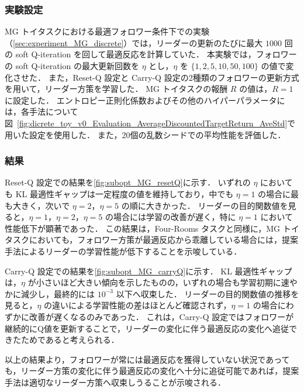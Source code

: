 \documentclass[originalpaper,fleqn]{jsaiart}     %
\begin{document}
\subsubsection{実験設定}

MG トイタスクにおける最適フォロワー条件下での実験（\ref{sec:experiment_MG_discrete}）では，リーダーの更新のたびに最大 $1000$ 回の soft Q-iteration を回して最適反応を計算していた．
本実験では，フォロワーの soft Q-iteration の最大更新回数を $\eta$ とし，$\eta$ を $\{1,2,5,10,50,100\}$ の値で変化させた．
また，Reset-Q 設定と Carry-Q 設定の2種類のフォロワーの更新方式を用いて，リーダー方策を学習した．
MG トイタスクの報酬 $R$ の値は，$R=1$ に設定した．
エントロピー正則化係数およびその他のハイパーパラメータには，各手法について図~\ref{fig:dicrete_toy_v0_Evaluation_AverageDiscountedTargetReturn_AveStd}で用いた設定を使用した．
また，20個の乱数シードでの平均性能を評価した．

\subsubsection{結果}

Reset-Q 設定での結果を\ref{fig:subopt_MG_resetQ}に示す．
いずれの $\eta$ においても KL 最適性ギャップは一定程度の値を維持しており，中でも $\eta=1$ の場合に最も大きく，次いで $\eta=2$，$\eta=5$ の順に大きかった．
リーダーの目的関数値を見ると，$\eta=1$，$\eta=2$，$\eta=5$ の場合には学習の改善が遅く，特に $\eta=1$ において性能低下が顕著であった．
この結果は，Four-Rooms タスクと同様に，MG トイタスクにおいても，フォロワー方策が最適反応から乖離している場合には，提案手法によるリーダーの学習性能が低下することを示唆している．

Carry-Q 設定での結果を\ref{fig:subopt_MG_carryQ}に示す．
KL 最適性ギャップは，$\eta$ が小さいほど大きい傾向を示したものの，いずれの場合も学習初期に速やかに減少し，最終的には $10^{-3}$ 以下へ収束した．
リーダーの目的関数値の推移を見ると，$\eta$ の違いによる学習性能の差はほとんど確認されず，$\eta=1$ の場合にわずかに改善が遅くなるのみであった．
これは，Carry-Q 設定ではフォロワーが継続的にQ値を更新することで，リーダーの変化に伴う最適反応の変化へ追従できたためであると考えられる．

以上の結果より，フォロワーが常には最適反応を獲得していない状況であっても，リーダー方策の変化に伴う最適反応の変化へ十分に追従可能であれば，提案手法は適切なリーダー方策へ収束しうることが示唆される．
\end{document}
